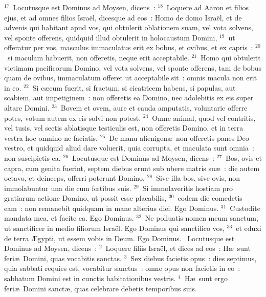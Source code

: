 ${}^{17}$~Locutusque est Dominus ad Moysen, dicens~:
${}^{18}$~Loquere ad Aaron et filios ejus, et ad omnes filios Isra\"el, dicesque ad eos~: Homo de domo Isra\"el, et de advenis qui habitant apud vos, qui obtulerit oblationem suam, vel vota solvens, vel sponte offerens, quidquid illud obtulerit in holocaustum Domini,
${}^{19}$~ut offeratur per vos, masculus immaculatus erit ex bobus, et ovibus, et ex capris~:
${}^{20}$~si maculam habuerit, non offeretis, neque erit acceptabile.
${}^{21}$~Homo qui obtulerit victimam pacificorum Domino, vel vota solvens, vel sponte offerens, tam de bobus quam de ovibus, immaculatum offeret ut acceptabile sit~: omnis macula non erit in eo.
${}^{22}$~Si c\ae cum fuerit, si fractum, si cicatricem habens, si papulas, aut scabiem, aut impetiginem~: non offeretis ea Domino, nec adolebitis ex eis super altare Domini.
${}^{23}$~Bovem et ovem, aure et cauda amputatis, voluntarie offerre potes, votum autem ex eis solvi non potest.
${}^{24}$~Omne animal, quod vel contritis, vel tusis, vel sectis ablatisque testiculis est, non offeretis Domino, et in terra vestra hoc omnino ne faciatis.
${}^{25}$~De manu alienigen\ae\ non offeretis panes Deo vestro, et quidquid aliud dare voluerit, quia corrupta, et maculata sunt omnia~: non suscipietis ea.
${}^{26}$~Locutusque est Dominus ad Moysen, dicens~:
${}^{27}$~Bos, ovis et capra, cum genita fuerint, septem diebus erunt sub ubere matris su\ae~: die autem octavo, et deinceps, offerri poterunt Domino.
${}^{28}$~Sive illa bos, sive ovis, non immolabuntur una die cum fœtibus suis.
${}^{29}$~Si immolaveritis hostiam pro gratiarum actione Domino, ut possit esse placabilis,
${}^{30}$~eodem die comedetis eam~: non remanebit quidquam in mane alterius diei. Ego Dominus.
${}^{31}$~Custodite mandata mea, et facite ea. Ego Dominus.
${}^{32}$~Ne polluatis nomen meum sanctum, ut sanctificer in medio filiorum Isra\"el. Ego Dominus qui sanctifico vos,
${}^{33}$~et eduxi de terra \AE gypti, ut essem vobis in Deum. Ego Dominus.
~Locutusque est Dominus ad Moysen, dicens~:
${}^{2}$~Loquere filiis Isra\"el, et dices ad eos~: H\ae\ sunt feri\ae\ Domini, quas vocabitis sanctas.
${}^{3}$~Sex diebus facietis opus~: dies septimus, quia sabbati requies est, vocabitur sanctus~: omne opus non facietis in eo~: sabbatum Domini est in cunctis habitationibus vestris.
${}^{4}$~H\ae\ sunt ergo feri\ae\ Domini sanct\ae , quas celebrare debetis temporibus suis.


